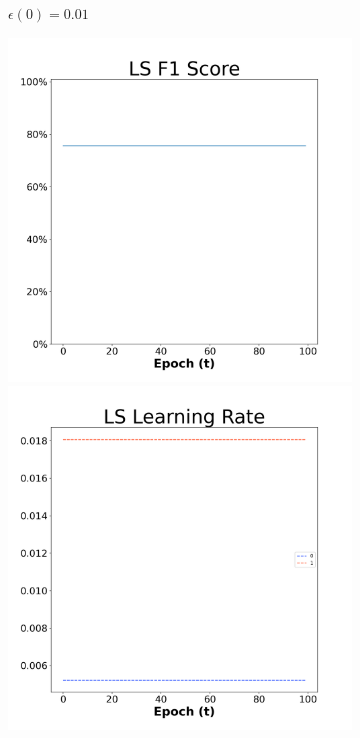 \begin{figure}[H]
\begin{subfigure}{0.3\textwidth}
  \caption{$\epsilon(0)=0.01$}
\end{subfigure}\hfil %
\begin{subfigure}{0.3\textwidth}
  \includegraphics[width=\linewidth]{images/exper2/NSP/LS_0.03_f1.png}
  \includegraphics[width=\linewidth]{images/exper2/NSP/LS_0.03_lr.png}

\end{subfigure}
\end{figure}
